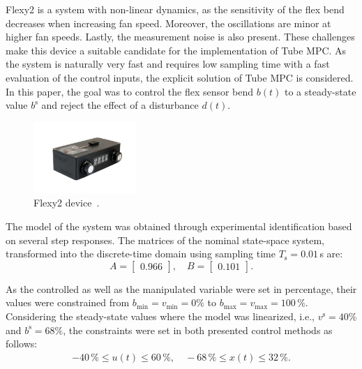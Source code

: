 \documentclass[letterpaper, 10 pt, conference]{ieeeconf}
\begin{document}
	Flexy2 is a system with non-linear dynamics, as the sensitivity of the flex bend decreases when increasing fan speed. Moreover, the oscillations are minor at higher fan speeds. Lastly, the measurement noise is also present. These challenges make this device a suitable candidate for the implementation of Tube MPC. As the system is naturally very fast and requires low sampling time with a fast evaluation of the control inputs, the explicit solution of Tube MPC is considered. In this paper, the goal was to control the flex sensor bend $b(t)$ to a steady-state value $b^\text{s}$ and reject the effect of a disturbance $d(t)$.
	
	\begin{figure}
		\begin{center}
			\includegraphics[width=0.35\textwidth]{images/flexy2}
			\caption{Flexy2 device~\cite{flexy2}.}
			\label{fig:flexy2}
		\end{center}
	\end{figure}
	
	The model of the system was obtained through experimental identification based on several step responses. The matrices of the nominal state-space system, transformed into the discrete-time domain using sampling time $T_\mathrm{s} = 0.01$\,s are:
	\begin{equation}
		\label{eq:model_A_B} 
		A = \begin{bmatrix}
			0.966
		\end{bmatrix}, \quad 
		B = \begin{bmatrix}
			0.101
		\end{bmatrix}. 
	\end{equation}
	
	As the controlled as well as the manipulated variable were set in percentage, their values were constrained from $b_{\min} = v_{\min} = 0\%$ to $b_{\max} = v_{\max} = 100\,\%$. Considering the steady-state values where the model was linearized, i.e., $ v^\mathrm{s} = 40\%$ and $ b^\mathrm{s} = 68\%$, the constraints were set in both presented control methods as follows: 
	\begin{eqnarray}
		\label{eq:const_u_y}
		-40\,\% \le u(t) \le 60\,\%, \quad -68\,\% \le x(t) \le 32\,\%.
	\end{eqnarray}
	
\end{document}
